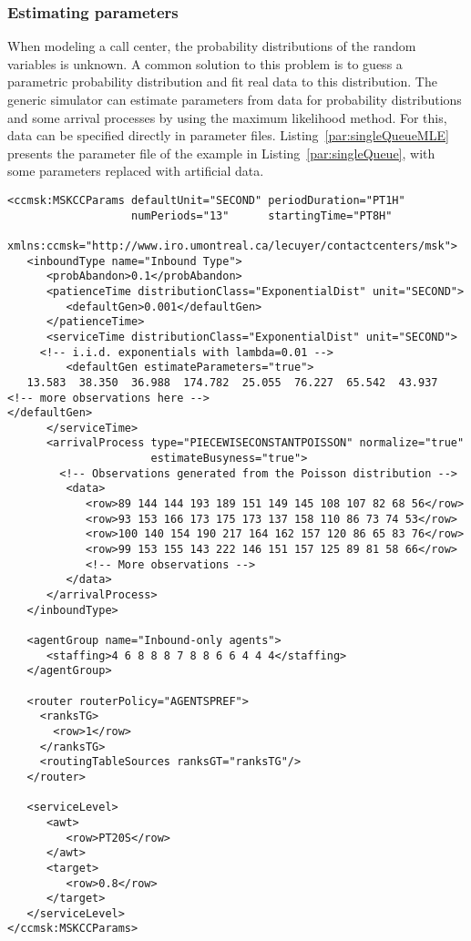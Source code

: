\subsubsection{Estimating parameters}
\label{sec:singleQueueMLE}

When modeling a call center, the probability
distributions of the random variables is unknown.
A common solution to this problem is to guess a parametric probability
distribution and fit real data to this distribution.
The generic simulator can estimate parameters from data for
probability distributions and some arrival processes by using
the maximum likelihood method.
For this, data can be specified directly in parameter files.
Listing~\ref{par:singleQueueMLE} presents the parameter file of the
example in Listing~\ref{par:singleQueue},
with some parameters replaced with artificial data.

\begin{lstlisting}[caption={\texttt{singleQueueMLE.xml}: Example of
  a parameter file with data for
  parameter estimation}, language=XML%
,label=par:singleQueueMLE]
<ccmsk:MSKCCParams defaultUnit="SECOND" periodDuration="PT1H"
                   numPeriods="13"      startingTime="PT8H"
     xmlns:ccmsk="http://www.iro.umontreal.ca/lecuyer/contactcenters/msk">
   <inboundType name="Inbound Type">
      <probAbandon>0.1</probAbandon>
      <patienceTime distributionClass="ExponentialDist" unit="SECOND">
         <defaultGen>0.001</defaultGen>
      </patienceTime>
      <serviceTime distributionClass="ExponentialDist" unit="SECOND">
     <!-- i.i.d. exponentials with lambda=0.01 -->
         <defaultGen estimateParameters="true">
   13.583  38.350  36.988  174.782  25.055  76.227  65.542  43.937
<!-- more observations here -->
</defaultGen>
      </serviceTime>
      <arrivalProcess type="PIECEWISECONSTANTPOISSON" normalize="true"
                      estimateBusyness="true">
        <!-- Observations generated from the Poisson distribution -->
         <data>
            <row>89 144 144 193 189 151 149 145 108 107 82 68 56</row>
            <row>93 153 166 173 175 173 137 158 110 86 73 74 53</row>
            <row>100 140 154 190 217 164 162 157 120 86 65 83 76</row>
            <row>99 153 155 143 222 146 151 157 125 89 81 58 66</row>
            <!-- More observations -->
         </data>
      </arrivalProcess>
   </inboundType>

   <agentGroup name="Inbound-only agents">
      <staffing>4 6 8 8 8 7 8 8 6 6 4 4 4</staffing>
   </agentGroup>

   <router routerPolicy="AGENTSPREF">
     <ranksTG>
       <row>1</row>
     </ranksTG>
     <routingTableSources ranksGT="ranksTG"/>
   </router>

   <serviceLevel>
      <awt>
         <row>PT20S</row>
      </awt>
      <target>
         <row>0.8</row>
      </target>
   </serviceLevel>
</ccmsk:MSKCCParams>
\end{lstlisting}

